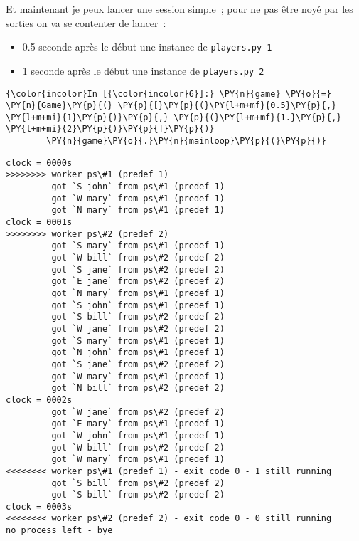     Et maintenant je peux lancer une session simple~; pour ne pas être noyé
par les sorties on va se contenter de lancer~:

\begin{itemize}
\tightlist
\item
  0.5 seconde après le début une instance de \texttt{players.py\ 1}
\item
  1 seconde après le début une instance de \texttt{players.py\ 2}
\end{itemize}

    \begin{Verbatim}[commandchars=\\\{\},frame=single,framerule=0.3mm,rulecolor=\color{cellframecolor}]
{\color{incolor}In [{\color{incolor}6}]:} \PY{n}{game} \PY{o}{=} \PY{n}{Game}\PY{p}{(} \PY{p}{[}\PY{p}{(}\PY{l+m+mf}{0.5}\PY{p}{,} \PY{l+m+mi}{1}\PY{p}{)}\PY{p}{,} \PY{p}{(}\PY{l+m+mf}{1.}\PY{p}{,} \PY{l+m+mi}{2}\PY{p}{)}\PY{p}{]}\PY{p}{)}
        \PY{n}{game}\PY{o}{.}\PY{n}{mainloop}\PY{p}{(}\PY{p}{)}
\end{Verbatim}


    \begin{Verbatim}[commandchars=\\\{\},frame=single,framerule=0.3mm,rulecolor=\color{cellframecolor}]
clock = 0000s
>>>>>>>> worker ps\#1 (predef 1)
         got `S john` from ps\#1 (predef 1)
         got `W mary` from ps\#1 (predef 1)
         got `N mary` from ps\#1 (predef 1)
clock = 0001s
>>>>>>>> worker ps\#2 (predef 2)
         got `S mary` from ps\#1 (predef 1)
         got `W bill` from ps\#2 (predef 2)
         got `S jane` from ps\#2 (predef 2)
         got `E jane` from ps\#2 (predef 2)
         got `N mary` from ps\#1 (predef 1)
         got `S john` from ps\#1 (predef 1)
         got `S bill` from ps\#2 (predef 2)
         got `W jane` from ps\#2 (predef 2)
         got `S mary` from ps\#1 (predef 1)
         got `N john` from ps\#1 (predef 1)
         got `S jane` from ps\#2 (predef 2)
         got `W mary` from ps\#1 (predef 1)
         got `N bill` from ps\#2 (predef 2)
clock = 0002s
         got `W jane` from ps\#2 (predef 2)
         got `E mary` from ps\#1 (predef 1)
         got `W john` from ps\#1 (predef 1)
         got `W bill` from ps\#2 (predef 2)
         got `W mary` from ps\#1 (predef 1)
<<<<<<<< worker ps\#1 (predef 1) - exit code 0 - 1 still running
         got `S bill` from ps\#2 (predef 2)
         got `S bill` from ps\#2 (predef 2)
clock = 0003s
<<<<<<<< worker ps\#2 (predef 2) - exit code 0 - 0 still running
no process left - bye
\end{Verbatim}

